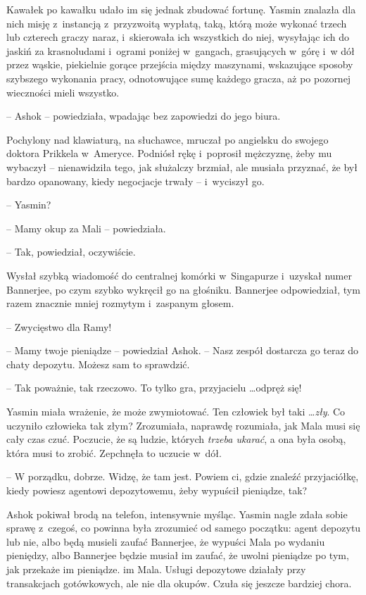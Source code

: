 \documentclass[oneside,polish,11pt,rmheadings]{mwbk}
\begin{document}
Kawałek po kawałku udało im się jednak zbudować fortunę. Yasmin znalazła dla nich misję z~instancją z~przyzwoitą wypłatą, taką, którą może wykonać trzech lub czterech graczy naraz, i~skierowała ich wszystkich do niej, wysyłając ich do jaskiń za krasnoludami i~ogrami poniżej w~gangach, grasujących w~górę i~w dół przez wąskie, piekielnie gorące przejścia między maszynami, wskazujące sposoby szybszego wykonania pracy, odnotowujące sumę każdego gracza, aż po pozornej wieczności mieli wszystko.

-- Ashok -- powiedziała, wpadając bez zapowiedzi do jego biura. 

Pochylony nad klawiaturą, na słuchawce, mruczał po angielsku do swojego doktora Prikkela w~Ameryce. Podniósł rękę i~poprosił mężczyznę, żeby mu wybaczył -- nienawidziła tego, jak służalczy brzmiał, ale musiała przyznać, że był bardzo opanowany, kiedy negocjacje trwały -- i~wyciszył go.

-- Yasmin? 

-- Mamy okup za Mali -- powiedziała.

-- Tak, powiedział, oczywiście. 

Wysłał szybką wiadomość do centralnej komórki w~Singapurze i~uzyskał numer Bannerjee, po czym szybko wykręcił go na głośniku. Bannerjee odpowiedział, tym razem znacznie mniej rozmytym i~zaspanym głosem.

-- Zwycięstwo dla Ramy!

-- Mamy twoje pieniądze -- powiedział Ashok. -- Nasz zespół dostarcza go teraz do chaty depozytu. Możesz sam to sprawdzić.

-- Tak poważnie, tak rzeczowo. To tylko gra, przyjacielu  \ldots  odpręż się! 

Yasmin miała wrażenie, że może zwymiotować. Ten człowiek był taki \ldots  \textit{zły}. Co uczyniło człowieka tak złym? Zrozumiała, naprawdę rozumiała, jak Mala musi się cały czas czuć. Poczucie, że są ludzie, których \textit{trzeba ukarać}, a ona była osobą, która musi to zrobić. Zepchnęła to uczucie w~dół.

-- W porządku, dobrze. Widzę, że tam jest. Powiem ci, gdzie znaleźć przyjaciółkę, kiedy powiesz agentowi depozytowemu, żeby wypuścił pieniądze, tak?

Ashok pokiwał brodą na telefon, intensywnie myśląc. Yasmin nagle zdała sobie sprawę z~czegoś, co powinna była zrozumieć od samego początku: agent depozytu lub nie, albo będą musieli zaufać Bannerjee, że wypuści Mala po wydaniu pieniędzy, albo Bannerjee będzie musiał im zaufać, że uwolni pieniądze po tym, jak przekaże im pieniądze. im Mala. Usługi depozytowe działały przy transakcjach gotówkowych, ale nie dla okupów. Czuła się jeszcze bardziej chora.
\end{document}
